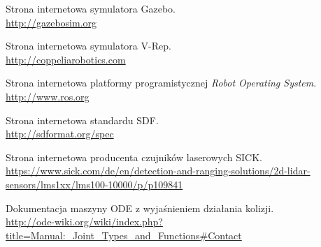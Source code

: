 \begin{thebibliography}{0}
Strona internetowa symulatora Gazebo. \\
\url{http://gazebosim.org}

Strona internetowa symulatora V-Rep. \\
\url{http://coppeliarobotics.com}

Strona internetowa platformy programistycznej \emph{Robot Operating System}. \\
\url{http://www.ros.org}

Strona internetowa standardu SDF. \\
\url{http://sdformat.org/spec}

Strona internetowa producenta czujników laserowych SICK. \\
\url{https://www.sick.com/de/en/detection-and-ranging-solutions/2d-lidar-sensors/lms1xx/lms100-10000/p/p109841}

Dokumentacja maszyny ODE z wyjaśnieniem działania kolizji. \\
\url{http://ode-wiki.org/wiki/index.php?title=Manual:_Joint_Types_and_Functions#Contact}

\end{thebibliography}
